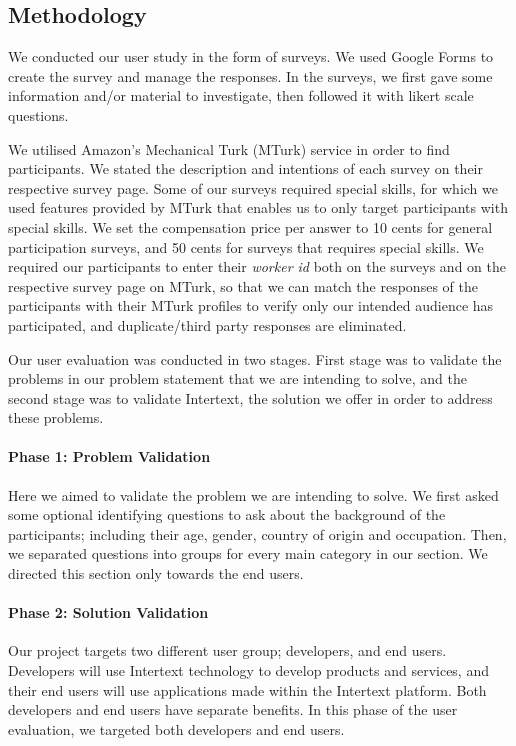 \subsection{Methodology}

We conducted our user study in the form of surveys. We used Google Forms to create the survey and manage the responses. In the surveys, we first gave some information and/or material to investigate, then followed it with likert scale questions.

We utilised Amazon's Mechanical Turk (MTurk) service in order to find participants. We stated the description and intentions of each survey on their respective survey page. Some of our surveys required special skills, for which we used features provided by MTurk that enables us to only target participants with special skills. We set the compensation price per answer to 10 cents for general participation surveys, and 50 cents for surveys that requires special skills. We required our participants to enter their \textit{worker id} both on the surveys and on the respective survey page on MTurk, so that we can match the responses of the participants with their MTurk profiles to verify only our intended audience has participated, and duplicate/third party responses are eliminated.

Our user evaluation was conducted in two stages. First stage was to validate the problems in our problem statement that we are intending to solve, and the second stage was to validate Intertext, the solution we offer in order to address these problems. 

\paragraph{Phase 1: Problem Validation}

Here we aimed to validate the problem we are intending to solve. We first asked some optional identifying questions to ask about the background of the participants; including their age, gender, country of origin and occupation. Then, we separated questions into groups for every main category in our  section. We directed this section only towards the end users.

\paragraph{Phase 2: Solution Validation}

Our project targets two different user group; developers, and end users. Developers will use Intertext technology to develop products and services, and their end users will use applications made within the Intertext platform. Both developers and end users have separate benefits. In this phase of the user evaluation, we targeted both developers and end users. 

